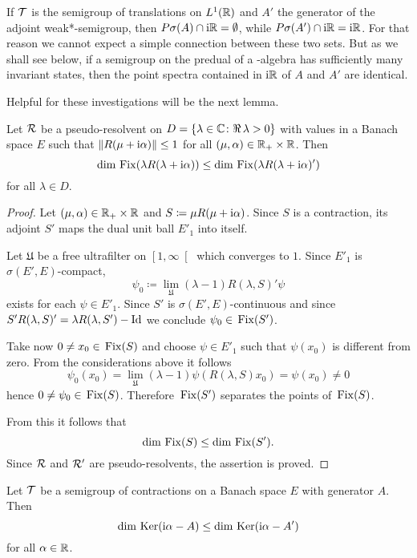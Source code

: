If $\mathcal{T}$ is the semigroup of translations on $L^1(\mathbb{R})$ and $A'$ the generator 
of the adjoint weak*-semigroup, then $P\sigma(A) \cap \mathrm{i}\mathbb{R} = \emptyset$, while $P{\sigma}(A') \cap \mathrm{i}\mathbb{R} = \mathrm{i}\mathbb{R}$.
For that reason we cannot expect a simple connection between these two sets.
But as we shall see below, if a semigroup on the predual of a \WA-algebra has sufficiently many invariant states, then the point spectra contained in $\mathrm{i}\mathbb{R}$ of $A$ and $A'$  are identical.

Helpful for these investigations will be the next lemma.
\begin{lemma}\label{lem:d3-1.6}
Let $\mathcal{R}$ be a pseudo-resolvent on $D = \{\lambda \in \mathbb{C} \colon \Re\,\lambda > 0\}$ with values in a Banach space $E$ such that $\|R(\mu + \mathrm{i}\alpha)\| \leq 1$ for all $(\mu,\alpha) \in \mathbb{R}_{+} \times \mathbb{R}$.
Then
\[
\dim \mathop{}\mathrm{Fix}(\lambda R(\lambda + \mathrm{i}\alpha)) \leq \dim \mathop{}\mathrm{Fix}(\lambda R(\lambda + \mathrm{i}\alpha)') 
\]
for all $\lambda \in D$.
\end{lemma}
\begin{proof}
Let $(\mu,\alpha) \in \mathbb{R}_{+} \times \mathbb{R}$ and $S \coloneqq \mu R(\mu + \mathrm{i}\alpha)$.
Since $S$ is a contraction, its adjoint $S'$ maps the dual unit ball $E'_{1}$ into itself.

Let $\mathfrak{U}$ be a free ultrafilter on $ \left[1,\infty \right[$ which converges to $1$.
Since $E'_{1}$ is $\sigma(E',E)$-compact, 
\[
\psi_{0} \coloneqq \lim_{\mathfrak{U}}(\lambda - 1)R(\lambda,S)'\psi
\]
exists for each $\psi \in E'_{1}$.
Since $S'$ is $\sigma(E',E)$-continuous and since $S'R(\lambda,S)' = \lambda R(\lambda,S')-\operatorname{Id}$ we conclude $\psi_{0} \in \mathop{}\mathrm{Fix}(S')$.

Take now $0 \neq x_{0} \in \mathop{}\mathrm{Fix}(S)$ and choose $\psi \in E'_{1}$ such that $\psi(x_{0})$ is different from zero.
From the considerations above it follows
\[
\psi_{0}(x_{0}) = \lim_{\mathfrak{U}}(\lambda - 1)\psi(R(\lambda,S)x_{0}) = \psi(x_{0}) \neq 0
\]
hence $0 \neq \psi_{0} \in \mathop{}\mathrm{Fix}(S)$.
Therefore $\mathop{}\mathrm{Fix}(S')$ separates the points of $\mathop{}\mathrm{Fix}(S)$.

From this it follows that
\[
	\dim \mathop{}\mathrm{Fix}(S) \leq \dim \mathop{}\mathrm{Fix}(S') .
\]
Since $\mathcal{R}$ and $\mathcal{R}'$ are pseudo-resolvents, the assertion is proved.
\end{proof}
\begin{corollary}\label{cor:d3-1.7}
Let $\mathcal{T}$ be a semigroup of contractions on a Banach space $E$ with generator $A$.
Then
\[
\dim \mathop{}\mathrm{Ker}(\mathrm{i}\alpha - A) \leq \dim \mathop{}\mathrm{Ker}(\mathrm{i}\alpha - A')
\]
for all $\alpha \in \mathbb{R}$.
\end{corollary}

